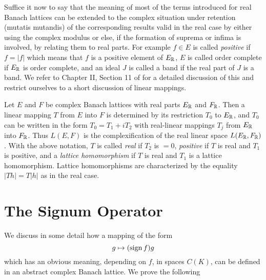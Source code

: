 Suffice it now to say that the meaning of most of the terms introduced for real Banach lattices can be extended to the complex situation under retention (mutatis mutandis) of the corresponding results valid in the real case by either using the complex modulus or else, if the formation of suprema or infima is involved, by relating them to real parts.
For example $ f \in E $ is called \emph{positive} if $ f = |f| $ which means that $ f $ is a positive element of $ E_{\mathbb{R}} $, $ E $ is called order complete if $ E_{\mathbb{R}} $ is order complete, and an ideal $ J $ is called a band if the real part of $ J $ is a band.
We refer to Chapter II, Section 11 of \citet{schaefer:1974} for a detailed discussion of this and restrict ourselves to a short discussion of linear mappings.

Let $ E $ and $ F $ be complex Banach lattices with real parts $ E_{\mathbb{R}} $ and $ F_{\mathbb{R}} $.
Then a linear mapping $ T $ from $ E $ into $ F $ is determined by its restriction $ T_{0} $ to $ E_{\mathbb{R}} $, and $ T_{0} $ can be written in the form $ T_{0} = T_{1} + iT_{2} $ with real-linear mappings $ T_{j} $ from $ E_{\mathbb{R}} $ into $ F_{\mathbb{R}} $.
Thus $ L(E,F) $ is the complexification of the real linear space $ L(E_{\mathbb{R}},F_{\mathbb{R}}) $.
With the above notation, $ T $ is called \emph{real} if $ T_{2} $ is $ = 0 $, \emph{positive} if $ T $ is real and $ T_{1} $ is positive, and a \emph{lattice homomorphism} if $ T $ is real and $ T_{1} $ is a lattice homomorphism.
Lattice homomorphisms are characterized by the equality $ |Th| = T|h| $ as in the real case.
\section{The Signum Operator}\label{sec:c1-8}
We discuss in some detail how a mapping of the form
\[
g \mapsto (\operatorname{sign} f )g
\]
which has an obvious meaning, depending on $ f $, in spaces $ C(K) $, can be defined in an abstract complex Banach lattice.
We prove the following

